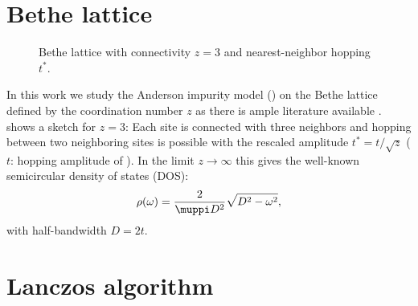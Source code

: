 \section{Bethe lattice}
\label{sec:bethe-lattice}

\begin{figure}[ht]
    \centering
    
    \caption{
        Bethe lattice with connectivity $z=3$ and nearest-neighbor hopping $t^*$.
    }
    \label{fig:bethe-lattice}
\end{figure}

In this work we study the Anderson impurity model ()
on the Bethe lattice defined by the coordination number $z$
as there is ample literature available \cite{Georges1996}.
 shows a sketch for $z=3$:
Each site is connected with three neighbors and hopping between two neighboring sites is possible
with the rescaled amplitude $t^* = t/\sqrt{z}$ \cite{Held2007}
($t$: hopping amplitude of ).
In the limit $z\to\infty$ this gives the well-known semicircular density of states (DOS):
\begin{equation}
    \rho(\omega) = \frac{2}{\muppi D^2} \sqrt{D^2 - \omega^2},
    \label{eq:dos-semicircle}
\end{equation}
with half-bandwidth $D=2t$.

\section{Lanczos algorithm}
\label{sec:lanczos-algorithm}

